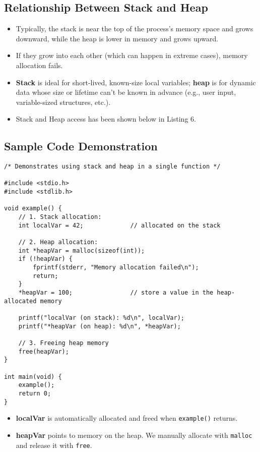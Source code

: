 \documentclass[a4paper,12pt]{article}
\begin{document}
\hrulefill

\newpage

\subsection{Relationship Between Stack and Heap}
\begin{itemize}
  \item Typically, the stack is near the top of the process’s memory space and grows downward, while the heap is lower in memory and grows upward.
  \item If they grow into each other (which can happen in extreme cases), memory allocation fails.
  \item \textbf{Stack} is ideal for short-lived, known-size local variables; \textbf{heap} is for dynamic data whose size or lifetime can’t be known in advance (e.g., user input, variable-sized structures, etc.).
  \item Stack and Heap access has been shown below in Listing 6.
\end{itemize}

\subsection{Sample Code Demonstration}
\begin{lstlisting}[caption=Stack and heap access example]
/* Demonstrates using stack and heap in a single function */

#include <stdio.h>
#include <stdlib.h>

void example() {
    // 1. Stack allocation:
    int localVar = 42;             // allocated on the stack

    // 2. Heap allocation:
    int *heapVar = malloc(sizeof(int));
    if (!heapVar) {
        fprintf(stderr, "Memory allocation failed\n");
        return;
    }
    *heapVar = 100;                // store a value in the heap-allocated memory

    printf("localVar (on stack): %d\n", localVar);
    printf("*heapVar (on heap): %d\n", *heapVar);

    // 3. Freeing heap memory
    free(heapVar);
}

int main(void) {
    example();
    return 0;
}
\end{lstlisting}
\begin{itemize}
    \item \textbf{localVar} is automatically allocated and freed when \texttt{example()} returns.
    \item \textbf{heapVar} points to memory on the heap. We manually allocate with \texttt{malloc} and release it with \texttt{free}.
\end{itemize}
\end{document}
